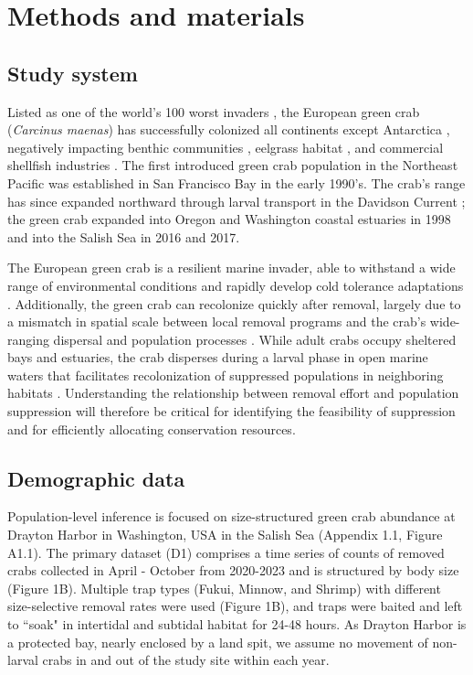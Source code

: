 \documentclass{article}
\begin{document}
\section{Methods and materials}

\subsection{Study system}

Listed as one of the world’s 100 worst invaders \parencite{lowe2000100}, the European green crab (\textit{Carcinus maenas}) has successfully colonized all continents except Antarctica \parencite{yamada2001global}, negatively impacting benthic communities \parencite{grosholz2005recent}, eelgrass habitat \parencite{garbary2014drastic, howard2019habitat}, and commercial shellfish industries \parencite{grosholz2011modeling}. The first introduced green crab population in the Northeast Pacific was established in San Francisco Bay in the early 1990's. The crab's range has since expanded northward through larval transport in the Davidson Current \parencite{yamada2021ocean}; the green crab expanded into Oregon and Washington coastal estuaries in 1998 and into the Salish Sea in 2016 and 2017. 

The European green crab is a resilient marine invader, able to withstand a wide range of environmental conditions and rapidly develop cold tolerance adaptations \parencite{tepolt2020rapid}. Additionally, the green crab can recolonize quickly after removal, largely due to a mismatch in spatial scale between local removal programs and the crab’s wide-ranging dispersal and population processes \parencite{keller2025transition}. While adult crabs occupy sheltered bays and estuaries, the crab disperses during a larval phase in open marine waters that facilitates recolonization of suppressed populations in neighboring habitats \parencite{yamada2021ocean}. Understanding the relationship between removal effort and population suppression will therefore be critical for identifying the feasibility of suppression and for efficiently allocating conservation resources. 

\subsection{Demographic data}

Population-level inference is focused on size-structured green crab abundance at Drayton Harbor in Washington, USA in the Salish Sea (Appendix 1.1, Figure A1.1). The primary dataset (D1) comprises a time series of counts of removed crabs collected in April - October from 2020-2023 and is structured by body size (Figure 1B). Multiple trap types (Fukui, Minnow, and Shrimp) with different size-selective removal rates were used (Figure 1B), and traps were baited and left to ``soak" in intertidal and subtidal habitat for 24-48 hours. As Drayton Harbor is a protected bay, nearly enclosed by a land spit, we assume no movement of non-larval crabs in and out of the study site within each year. 
\end{document}
